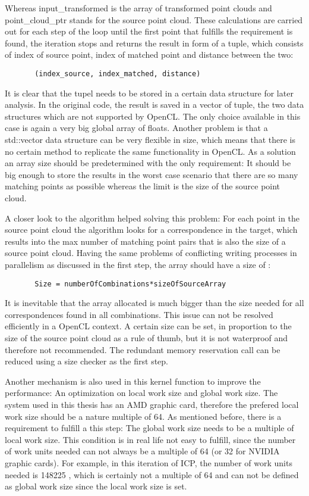 Whereas input\_transformed is the array of transformed point clouds and point\_cloud\_ptr stands for the source point cloud. These calculations are carried out for each step of the loop until the first point that fulfills the requirement is found, the iteration stops and returns the result in form of a tuple, which consists of index of source point, index of matched point and distance between the two:
\begin{lstlisting}
       (index_source, index_matched, distance)
\end{lstlisting}  

It is clear that the tupel needs to be stored in a certain data structure for later analysis. In the original code, the result is saved in a vector of tuple, the two data structures which are not supported by OpenCL. The only choice available in this case is again a very big global array of floats. Another problem is that a std::vector data structure can be very flexible in size, which means that there is no certain method to replicate the same functionality in OpenCL. As a solution an array size should be predetermined with the only requirement: It should be big enough to store the results in the worst case scenario that there are so many matching points as possible whereas the limit is the size of the source point cloud.

A closer look to the algorithm helped solving this problem: For each point in the source point cloud the algorithm looks for a correspondence in the target, which results into the max number of matching point pairs that is also the size of a source point cloud. Having the same problems of conflicting writing processes in parallelism as discussed in the first step, the array should have a size of :

\begin{lstlisting}
       Size = numberOfCombinations*sizeOfSourceArray
\end{lstlisting}

It is inevitable that the array allocated is much bigger than the size needed for all correspondences found in all combinations. This issue can not be resolved efficiently in a OpenCL context. A certain size can be set, in proportion to the size of  the source point cloud as a rule of thumb, but it is not waterproof and therefore not recommended. The redundant memory reservation call can be reduced using a size checker as the first step.

Another mechanism is also used in this kernel function to improve the performance: An optimization on local work size and global work size. The system used in this thesis has an AMD graphic card, therefore the prefered local work size should be a nature multiple of 64\cite{amdopencl}. As mentioned before, there is a requirement to fulfill a this step: The global work size needs to be a multiple of local work size. This condition is in real life not easy to fulfill, since the number of work units needed can not always be a multiple of 64 (or 32 for NVIDIA graphic cards\cite{nvidiaopencl}). For example, in this iteration of ICP, the number of work units needed is 148225 , which is certainly not a multiple of 64 and can not be defined as global work size since the local work size is set.

